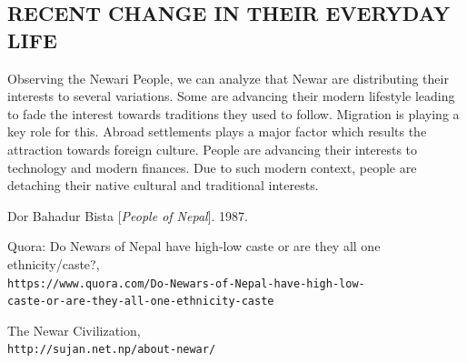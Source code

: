 \documentclass[a4paper,13pt, margin=0.9in]{article}
\begin{document}
\begin{flushleft}
\newpage
\section{RECENT CHANGE IN THEIR EVERYDAY LIFE}
Observing the Newari People, we can analyze that Newar are distributing their interests to several variations. Some are advancing their modern lifestyle leading to fade the interest towards traditions they used to follow. Migration is playing a key role for this. Abroad settlements plays a major factor which results the attraction towards foreign culture. People are advancing their interests to technology and modern finances. Due to such modern context, people are detaching their native cultural and traditional interests. 
	


\newpage

\begin{thebibliography}{9}

Dor Bahadur Bista 
[\textit{People of Nepal}]. 
1987.

Quora: Do Newars of Nepal have high-low caste or are they all one ethnicity/caste?, 
\\\texttt{https://www.quora.com/Do-Newars-of-Nepal-have-high-low- \\ caste-or-are-they-all-one-ethnicity-caste}

The Newar Civilization, 
\\\texttt{http://sujan.net.np/about-newar/}

\end{thebibliography}

\end{flushleft}
\end{document}
